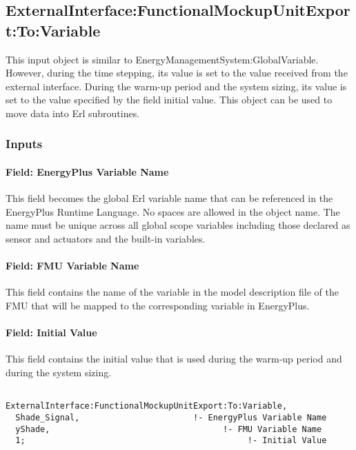 \subsection{ExternalInterface:FunctionalMockupUnitExport:To:Variable}\label{externalinterfacefunctionalmockupunitexporttovariable}

This input object is similar to EnergyManagementSystem:GlobalVariable. However, during the time stepping, its value is set to the value received from the external interface. During the warm-up period and the system sizing, its value is set to the value specified by the field initial value. This object can be used to move data into Erl subroutines.

\subsubsection{Inputs}\label{inputs-12-004}

\paragraph{Field: EnergyPlus Variable Name}\label{field-energyplus-variable-name-7}

This field becomes the global Erl variable name that can be referenced in the EnergyPlus Runtime Language. No spaces are allowed in the object name. The name must be unique across all global scope variables including those declared as sensor and actuators and the built-in variables.

\paragraph{Field: FMU Variable Name}\label{field-fmu-variable-name-7}

This field contains the name of the variable in the model description file of the FMU that will be mapped to the corresponding variable in EnergyPlus.

\paragraph{Field: Initial Value}\label{field-initial-value-8}

This field contains the initial value that is used during the warm-up period and during the system sizing.

\begin{lstlisting}

ExternalInterface:FunctionalMockupUnitExport:To:Variable,
  Shade_Signal,                       !- EnergyPlus Variable Name
  yShade,                                   !- FMU Variable Name
  1;                                             !- Initial Value
\end{lstlisting}
